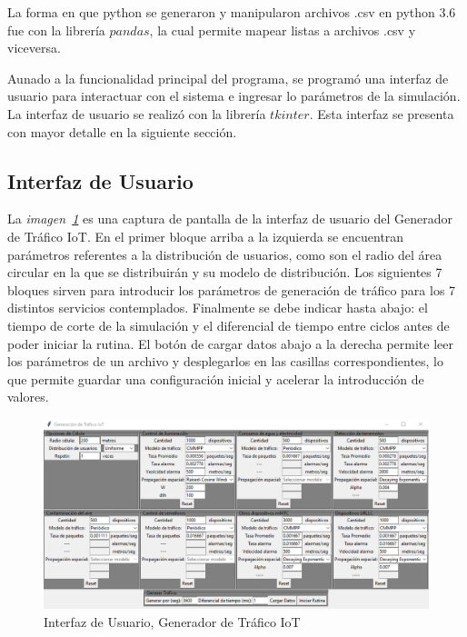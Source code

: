     La forma en que python se generaron y manipularon archivos .csv en python 3.6 fue con la librería $pandas$, la cual permite mapear listas a archivos .csv y viceversa. \newline

    Aunado a la funcionalidad principal del programa, se programó una interfaz de usuario para interactuar con el sistema e ingresar lo parámetros de la simulación. La interfaz de usuario se realizó con la librería $tkinter$. Esta interfaz se presenta con mayor detalle en la siguiente sección. \newline


\subsection{Interfaz de Usuario}

    La \textit{imagen~\ref{fig:GUITrafico}} es una captura de pantalla de la interfaz de usuario del Generador de Tráfico IoT. En el primer bloque arriba a la izquierda se encuentran parámetros referentes a la distribución de usuarios, como son el radio del área circular en la que se distribuirán y su modelo de distribución. Los siguientes 7 bloques sirven para introducir los parámetros de generación de tráfico para los 7 distintos servicios contemplados. Finalmente se debe indicar hasta abajo: el tiempo de corte de la simulación y el diferencial de tiempo entre ciclos antes de poder iniciar la rutina. El botón de cargar datos abajo a la derecha permite leer los parámetros de un archivo y desplegarlos en las casillas correspondientes, lo que permite guardar una configuración inicial y acelerar la introducción de valores. \newline

    
\begin{figure}[th]
    \centering
    \includegraphics[scale=.65]{Figures/GUI.png}
    \decoRule
    \caption[Interfaz de Usuario, Generador de Tráfico IoT]{Interfaz de Usuario, Generador de Tráfico IoT}
    \label{fig:GUITrafico}
\end{figure}

